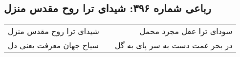 \begin{center}
\section*{رباعی شماره ۳۹۶: شیدای ترا روح مقدس منزل}
\label{sec:sh396}
\begin{longtable}{l p{0.5cm} r}
شیدای ترا روح مقدس منزل
&&
سودای ترا عقل مجرد محمل
\\
سیاح جهان معرفت یعنی دل
&&
در بحر غمت دست به سر پای به گل
\\
\end{longtable}
\end{center}
